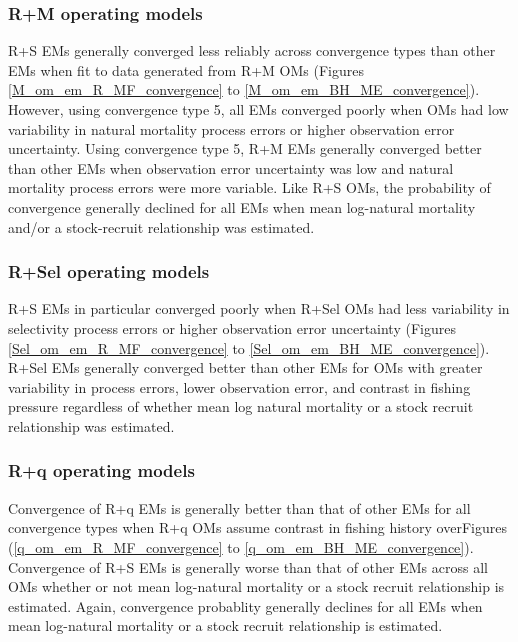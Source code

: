 \documentclass[
  12pt,
]{article}
\begin{document}
\hypertarget{rm-operating-models}{%
\subsubsection*{R+M operating models}\label{rm-operating-models}}

R+S EMs generally converged less reliably across convergence types than
other EMs when fit to data generated from R+M OMs (Figures
\ref{M_om_em_R_MF_convergence} to \ref{M_om_em_BH_ME_convergence}).
However, using convergence type 5, all EMs converged poorly when OMs had
low variability in natural mortality process errors or higher
observation error uncertainty. Using convergence type 5, R+M EMs
generally converged better than other EMs when observation error
uncertainty was low and natural mortality process errors were more
variable. Like R+S OMs, the probability of convergence generally
declined for all EMs when mean log-natural mortality and/or a
stock-recruit relationship was estimated.

\hypertarget{rsel-operating-models}{%
\subsubsection*{R+Sel operating models}\label{rsel-operating-models}}

R+S EMs in particular converged poorly when R+Sel OMs had less
variability in selectivity process errors or higher observation error
uncertainty (Figures \ref{Sel_om_em_R_MF_convergence} to
\ref{Sel_om_em_BH_ME_convergence}). R+Sel EMs generally converged better
than other EMs for OMs with greater variability in process errors, lower
observation error, and contrast in fishing pressure regardless of
whether mean log natural mortality or a stock recruit relationship was
estimated.

\hypertarget{rq-operating-models}{%
\subsubsection*{R+q operating models}\label{rq-operating-models}}

Convergence of R+q EMs is generally better than that of other EMs for
all convergence types when R+q OMs assume contrast in fishing history
overFigures (\ref{q_om_em_R_MF_convergence} to
\ref{q_om_em_BH_ME_convergence}). Convergence of R+S EMs is generally
worse than that of other EMs across all OMs whether or not mean
log-natural mortality or a stock recruit relationship is estimated.
Again, convergence probablity generally declines for all EMs when mean
log-natural mortality or a stock recruit relationship is estimated.
\end{document}
